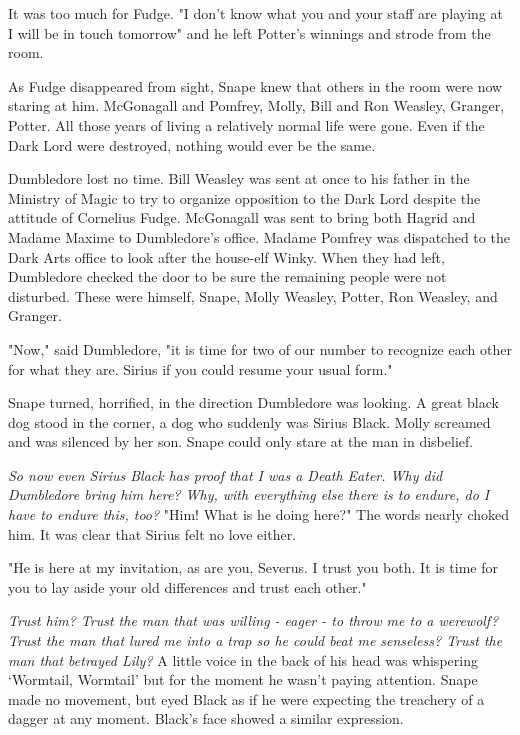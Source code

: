 It was too much for Fudge. "I don't know what you and your staff are playing at{\el} I will be in touch tomorrow{\el}" and he left Potter's winnings and strode from the room.

As Fudge disappeared from sight, Snape knew that others in the room were now staring at him. McGonagall and Pomfrey, Molly, Bill and Ron Weasley, Granger, Potter. All those years of living a relatively normal life were gone. Even if the Dark Lord were destroyed, nothing would ever be the same.

Dumbledore lost no time. Bill Weasley was sent at once to his father in the Ministry of Magic to try to organize opposition to the Dark Lord despite the attitude of Cornelius Fudge. McGonagall was sent to bring both Hagrid and Madame Maxime to Dumbledore's office. Madame Pomfrey was dispatched to the Dark Arts office to look after the house-elf Winky. When they had left, Dumbledore checked the door to be sure the remaining people were not disturbed. These were himself, Snape, Molly Weasley, Potter, Ron Weasley, and Granger.

"Now," said Dumbledore, "it is time for two of our number to recognize each other for what they are. Sirius{\el} if you could resume your usual form."

Snape turned, horrified, in the direction Dumbledore was looking. A great black dog stood in the corner, a dog who suddenly was Sirius Black. Molly screamed and was silenced by her son. Snape could only stare at the man in disbelief.

\emph{So now even Sirius Black has proof that I was a Death Eater. Why did Dumbledore bring him here? Why, with everything else there is to endure, do I have to endure this, too?} "Him! What is he doing here?" The words nearly choked him. It was clear that Sirius felt no love either.

"He is here at my invitation, as are you, Severus. I trust you both. It is time for you to lay aside your old differences and trust each other."

\emph{Trust him? Trust the man that was willing - eager - to throw me to a werewolf? Trust the man that lured me into a trap so he could beat me senseless? Trust the man that betrayed Lily?} A little voice in the back of his head was whispering `Wormtail, Wormtail' but for the moment he wasn't paying attention. Snape made no movement, but eyed Black as if he were expecting the treachery of a dagger at any moment. Black's face showed a similar expression.

